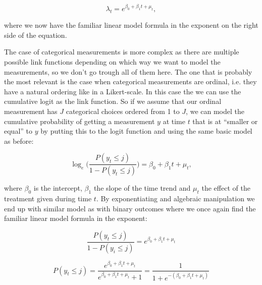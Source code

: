 \documentclass[12pt,a4paper,leqno]{report}
\theoremstyle{plain}
\theoremstyle{definition}
\theoremstyle{remark}
\begin{document}
\begin{def}\label{oneerror}
    \begin{equation}
        \lambda_t=e^{\beta_0 + \beta_1 t + \mu_t},
    \end{equation}
\end{def}where we now have the familiar linear model formula in the exponent on
the right side of the equation.

The case of categorical measurements is more complex as there are multiple
possible link functions depending on which way we want to model the
measurements, so we don't go trough all of them here. The one that is probably
the most relevant is the case when categorical measurements are ordinal, i.e.
they have a natural ordering like in a Likert-scale. In this case the we can
use the cumulative logit as the link function. So if we assume that our ordinal
measurement has \(J\) categorical choices ordered from 1 to \(J\), we can model
the cumulative probability of getting a measurement \(y\) at time \(t\) that is at
``smaller or equal'' to \(y\) by putting this to the logit function and using the same
basic model as before:

\begin{def}\label{oneerror}
    \begin{equation}
        \log_e\bigg({\frac{P(y_t \leq j)}{1 - P(y_t \leq j)}}\bigg)=\beta_0 + \beta_1 t + \mu_t,
    \end{equation}
\end{def}where \(\beta_0\) is the intercept, \(\beta_1\) the slope of the time
trend and \(\mu_t\) the effect of the treatment given during time \(t\). By
exponentiating and algebraic manipulation we end up with similar model as with
binary outcomes where we once again find the familiar linear model formula in
the exponent:

\begin{def}\label{}
    \begin{equation}\label{ord_exponentiating}
        \frac{P(y_t \leq j)}{1 - P(y_i \leq j)}=e^{\beta_0 + \beta_1 t + \mu_t}
    \end{equation}
\end{def}

\begin{def}\label{}
    \begin{equation}\label{ord_algmanipulation}
        P(y_t \leq j)=\frac{e^{\beta_0 + \beta_1 t + \mu_t}}{e^{\beta_0 + \beta_1 t + \mu_t}+1}=\frac{1}{1+e^{-(\beta_0 + \beta_1 t + \mu_t)}}
    \end{equation}
\end{def}
\end{document}
